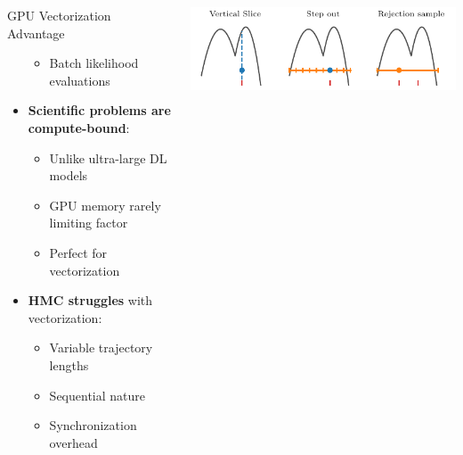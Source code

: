 \documentclass[aspectratio=169]{beamer}
\begin{document}
\begin{frame}
\begin{columns}
\begin{block}{GPU Vectorization Advantage}
\begin{itemize}
\begin{itemize}
                        \item Batch likelihood evaluations
                    \end{itemize}
                \item \textbf{Scientific problems are compute-bound}:
                    \begin{itemize}
                        \item Unlike ultra-large DL models
                        \item GPU memory rarely limiting factor
                        \item Perfect for vectorization
                    \end{itemize}
                \item \textbf{HMC struggles} with vectorization:
                    \begin{itemize}
                        \item Variable trajectory lengths
                        \item Sequential nature
                        \item Synchronization overhead
                    \end{itemize}
            \end{itemize}
        \end{block}
        \vspace{5pt}
        \includegraphics[width=\textwidth]{figures/slice_sampling_diagram}
    \end{columns}
\end{frame}
\end{document}
